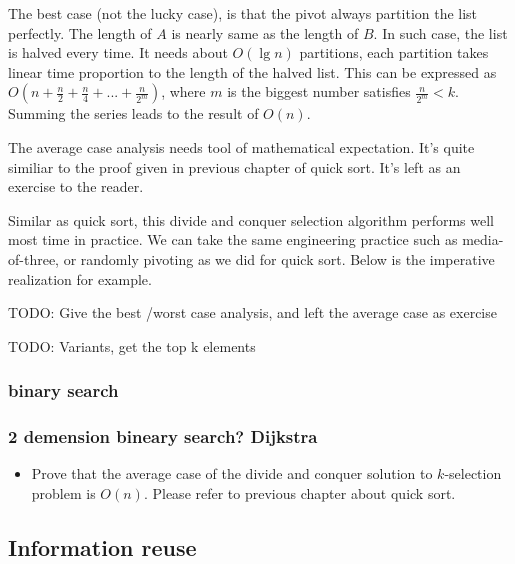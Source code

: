 \documentclass{article}
\begin{document}
The best case (not the lucky case), is that the pivot always partition the list perfectly.
The length of $A$ is nearly same as the length of $B$. In such case, the list is halved
every time. It needs about $O(\lg n)$ partitions, each partition takes linear time proportion
to the length of the halved list. This can be expressed as 
$O(n + \frac{n}{2} + \frac{n}{4} + ... + \frac{n}{2^m})$, where $m$ is the biggest number satisfies
$\frac{n}{2^m} < k$. Summing the series leads to the result of $O(n)$.

The average case analysis needs tool of mathematical expectation. It's quite similiar to the
proof given in previous chapter of quick sort. It's left as an exercise to the reader.

Similar as quick sort, this divide and conquer selection algorithm performs well most time
in practice. We can take the same engineering practice such as media-of-three, or randomly
pivoting as we did for quick sort. Below is the imperative realization for example.

\begin{algorithmic}[1]
  
\end{algorithmic}

TODO: Give the best /worst case analysis, and left the average case as exercise

TODO: Variants, get the top k elements

\subsubsection{binary search}

\subsubsection{2 demension bineary search? Dijkstra}

\begin{Exercise}
\begin{itemize}
\item Prove that the average case of the divide and conquer solution to $k$-selection problem is $O(n)$. Please refer to previous chapter about quick sort.
\end{itemize}
\end{Exercise}

\subsection{Information reuse}
\end{document}
